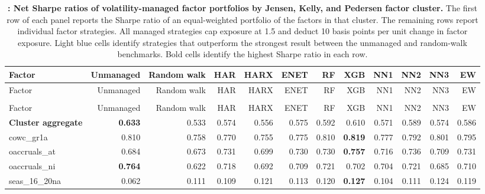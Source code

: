 \begin{landscape}
\begingroup\scriptsize
\captionsetup{justification=raggedright,labelsep=none,singlelinecheck=false,labelformat=boldlabel}
\setlength{\tabcolsep}{2.5pt}
\begin{longtable}{>{\raggedright\arraybackslash}p{2.6cm}rrrrrrrrrrr}
\caption[Net Sharpe ratios of volatility-managed factor portfolios by Jensen, Kelly, and Pedersen factor cluster.]{\footnotesize \textbf{: Net Sharpe ratios of volatility-managed factor portfolios by Jensen, Kelly, and Pedersen factor cluster.} The first row of each panel reports the Sharpe ratio of an equal-weighted portfolio of the factors in that cluster. The remaining rows report individual factor strategies. All managed strategies cap exposure at 1.5 and deduct 10 basis points per unit change in factor exposure. Light blue cells identify strategies that outperform the strongest result between the unmanaged and random-walk benchmarks. Bold cells identify the highest Sharpe ratio in each row.}\label{tab:rv-portfolio_factor_sharpe}\\
\hline
Factor & Unmanaged & Random walk & HAR & HARX & ENET & RF & XGB & NN1 & NN2 & NN3 & EW \\
\hline\endfirsthead
\hline
Factor & Unmanaged & Random walk & HAR & HARX & ENET & RF & XGB & NN1 & NN2 & NN3 & EW \\
\hline\endhead
\hline\endfoot
\multicolumn{12}{@{}l}{\textit{Panel A. Accruals}} \\
\hline
Factor & Unmanaged & Random walk & HAR & HARX & ENET & RF & XGB & NN1 & NN2 & NN3 & EW \\
\hline
\textbf{Cluster aggregate} & \textbf{0.633} & 0.533 & 0.574 & 0.556 & 0.575 & 0.592 & 0.610 & 0.571 & 0.589 & 0.574 & 0.586 \\
cowc\_gr1a & 0.810 & 0.758 & 0.770 & 0.755 & 0.775 & 0.810 & \textbf{\cellcolor{blue!10}0.819} & 0.777 & 0.792 & 0.801 & 0.795 \\
oaccruals\_at & 0.684 & 0.673 & \cellcolor{blue!10}0.731 & \cellcolor{blue!10}0.699 & \cellcolor{blue!10}0.730 & \cellcolor{blue!10}0.730 & \textbf{\cellcolor{blue!10}0.757} & \cellcolor{blue!10}0.716 & \cellcolor{blue!10}0.736 & \cellcolor{blue!10}0.709 & \cellcolor{blue!10}0.731 \\
oaccruals\_ni & \textbf{0.764} & 0.622 & 0.718 & 0.692 & 0.709 & 0.721 & 0.702 & 0.704 & 0.721 & 0.685 & 0.710 \\
seas\_16\_20na & 0.062 & 0.111 & 0.109 & \cellcolor{blue!10}0.121 & \cellcolor{blue!10}0.113 & \cellcolor{blue!10}0.120 & \textbf{\cellcolor{blue!10}0.127} & 0.104 & \cellcolor{blue!10}0.111 & \cellcolor{blue!10}0.124 & \cellcolor{blue!10}0.119 \\

\end{longtable}
\end{landscape}
